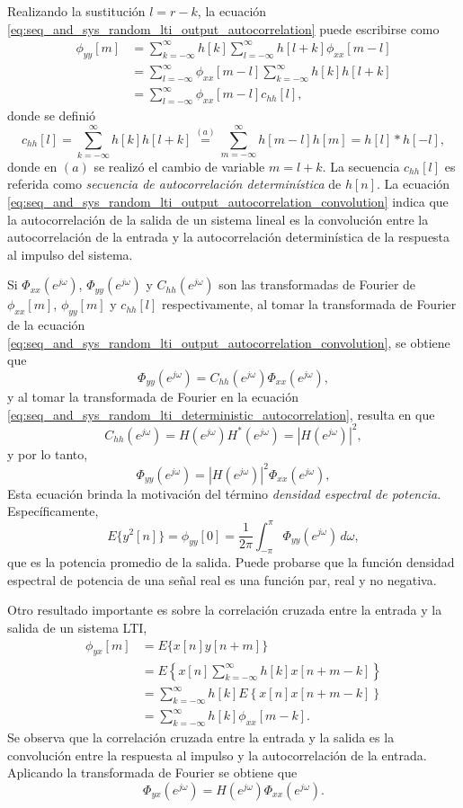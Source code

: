 \documentclass[a4paper]{report}
\begin{document}
Realizando la sustitución \(l=r-k\), la ecuación \ref{eq:seq_and_sys_random_lti_output_autocorrelation} puede escribirse como
\begin{align}
 \phi_{yy}[m]&=\sum_{k=-\infty}^\infty h[k]\sum_{l=-\infty}^\infty h[l+k]\phi_{xx}[m-l]\nonumber\\
   &=\sum_{l=-\infty}^\infty\phi_{xx}[m-l]\sum_{k=-\infty}^\infty h[k]h[l+k]\nonumber\\
   &=\sum_{l=-\infty}^\infty\phi_{xx}[m-l]c_{hh}[l],\label{eq:seq_and_sys_random_lti_output_autocorrelation_convolution}
\end{align}
donde se definió
\begin{equation}\label{eq:seq_and_sys_random_lti_deterministic_autocorrelation}
 c_{hh}[l]=\sum_{k=-\infty}^\infty h[k]h[l+k]\overset{(a)}{=}\sum_{m=-\infty}^\infty h[m-l]h[m]=h[l]*h[-l], 
\end{equation}
donde en \((a)\) se realizó el cambio de variable \(m=l+k\). La secuencia \(c_{hh}[l]\) es referida como \emph{secuencia de autocorrelación determinística} de \(h[n]\). La ecuación \ref{eq:seq_and_sys_random_lti_output_autocorrelation_convolution} indica que la autocorrelación de la salida de un sistema lineal es la convolución entre la autocorrelación de la entrada y la autocorrelación determinística de la respuesta al impulso del sistema.
 
Si \(\Phi_{xx}(e^{j\omega})\), \(\Phi_{yy}(e^{j\omega})\) y \(C_{hh}(e^{j\omega})\) son las transformadas de Fourier de \(\phi_{xx}[m]\), \(\phi_{yy}[m]\) y \(c_{hh}[l]\) respectivamente, al tomar la transformada de Fourier de la ecuación \ref{eq:seq_and_sys_random_lti_output_autocorrelation_convolution}, se obtiene que 
\[
 \Phi_{yy}(e^{j\omega})=C_{hh}(e^{j\omega})\Phi_{xx}(e^{j\omega}),
\]
y al tomar la transformada de Fourier en la ecuación \ref{eq:seq_and_sys_random_lti_deterministic_autocorrelation}, resulta en que 
\[
 C_{hh}(e^{j\omega})=H(e^{j\omega})H^*(e^{j\omega})=|H(e^{j\omega})|^2,
\]
y por lo tanto,
\[
 \Phi_{yy}(e^{j\omega})=|H(e^{j\omega})|^2\Phi_{xx}(e^{j\omega}),
\]
Esta ecuación brinda la motivación del término \emph{densidad espectral de potencia}. Específicamente,
\[
 E\{y^2[n]\}=\phi_{yy}[0]=\frac{1}{2\pi}\int_{-\pi}^\pi\Phi_{yy}(e^{j\omega})\,d\omega, 
\]
que es la potencia promedio de la salida. Puede probarse que la función densidad espectral de potencia de una señal real es una función par, real y no negativa.

Otro resultado importante es sobre la correlación cruzada entre la entrada y la salida de un sistema LTI,
\begin{align*}
 \phi_{yx}[m]&=E\{x[n]y[n+m]\}\\
   &=E\left\{x[n]\sum_{k=-\infty}^\infty h[k]x[n+m-k]\right\}\\
   &=\sum_{k=-\infty}^\infty h[k]E\left\{x[n]x[n+m-k]\right\}\\
   &=\sum_{k=-\infty}^\infty h[k]\phi_{xx}[m-k].
\end{align*}
Se observa que la correlación cruzada entre la entrada y la salida es la convolución entre la respuesta al impulso y la autocorrelación de la entrada. Aplicando la transformada de Fourier se obtiene que 
\[
 \Phi_{yx}(e^{j\omega})=H(e^{j\omega})\Phi_{xx}(e^{j\omega}).
\]
\end{document}
